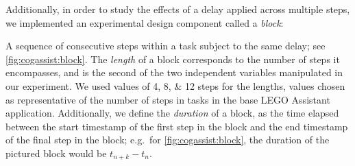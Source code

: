\documentclass[10pt,letterpaper]{article}
\begin{document}
Additionally, in order to study the effects of a delay applied across multiple steps, we implemented an experimental design component called a \emph{block}:

\begin{definition}[Block]
  A sequence of consecutive steps within a task subject to the same delay; see \cref{fig:cogassist:block}.
  The \emph{length} of a block corresponds to the number of steps it encompasses, and is the second of the two independent variables manipulated in our experiment.
  We used values of \numlist{4;8;12} steps for the lengths, values chosen as representative of the number of steps in tasks in the base LEGO Assistant application.
  Additionally, we define the \emph{duration} of a block, as the time elapsed between the start timestamp of the first step in the block and the end timestamp of the final step in the block; e.g.\ for \cref{fig:cogassist:block}, the duration of the pictured block would be \( t_{n+k} - t_{n} \).
\end{definition}
\end{document}
